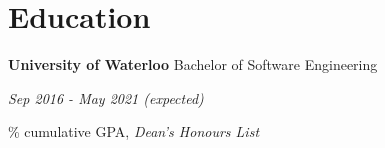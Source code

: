 \documentclass[paper=a4,fontsize=15pt]{scrartcl}
\newcommand{\quarterspace}{\vspace*{0.25em}}
\begin{document}
\section*{Education}{}
\noindent \textbf{University of Waterloo} Bachelor of Software Engineering \par
\quarterspace
\footnotesize
\noindent \textit{Sep 2016 - May 2021 (expected)} \par
{}\% cumulative GPA, \textit{Dean's Honours List}
\end{document}
